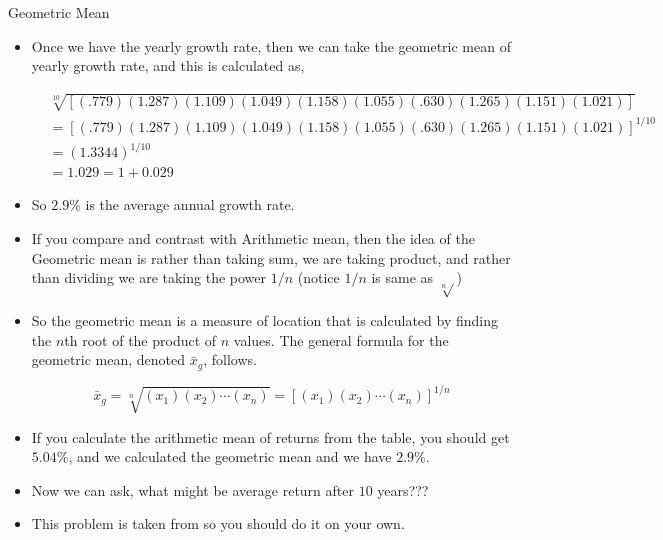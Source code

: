 \documentclass[8pt, usepdftitle=false]{beamer}
\begin{document}
\begin{frame}{Geometric Mean}

\begin{itemize}
  
\item Once we have the yearly growth rate, then we can take the geometric mean of yearly growth rate, and this is calculated as,

\begin{align*}
  &\sqrt[10]{[(.779)(1.287)(1.109)(1.049)(1.158)(1.055)(.630)(1.265)(1.151)(1.021)]} \\
  &= {[(.779)(1.287)(1.109)(1.049)(1.158)(1.055)(.630)(1.265)(1.151)(1.021)]}^{1/10} \\
  &= (1.3344)^{1/10} \\
  &= 1.029 = 1 + 0.029
\end{align*}

\item So $2.9\%$ is the average annual growth rate.



\item If you compare and contrast with Arithmetic mean, then the idea of the Geometric mean is rather than taking sum, we are taking product, and rather than dividing we are taking the power $1/n$ (notice $1/n$ is same as $\sqrt[n]{}$)

\item So the geometric mean is a measure of location that is calculated by finding the $n$th root of the product of $n$ values. The general formula for the geometric mean, denoted $\bar{x}_g$, follows.

$$
\bar{x}_g=\sqrt[n]{\left(x_1\right)\left(x_2\right) \cdots\left(x_n\right)}=\left[\left(x_1\right)\left(x_2\right) \cdots\left(x_n\right)\right]^{1 / n}
$$

\item If you calculate the arithmetic mean of returns from the table, you should get $5.04\%$, and we calculated the geometric mean and we have $2.9\%$.

\item Now we can ask, what might be average return after $10$ years???


\item This problem is taken from \citet*{anderson_statistics_2020} so you should do it on your own.

\end{itemize}
  
\end{frame}
\end{document}
